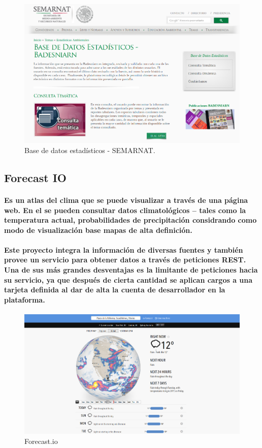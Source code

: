     \begin{figure}[h!]
        \centering
          \includegraphics[width=\textwidth]{./images/BADESNIARN.png}
        \caption{Base de datos estadísticos - SEMARNAT.}
    \end{figure}

  \subsection {Forecast IO}
    \paragraph {Es un atlas del clima que se puede visualizar a través de una página web. En el se pueden consultar datos climatológicos – tales como la temperatura actual, probabilidades de precipitación considrando como modo de visualización base mapas de alta definición.}

    \paragraph{Este proyecto integra la información de diversas fuentes y también provee un servicio para obtener datos a través de peticiones REST. Una de sus más grandes desventajas es la limitante de peticiones hacia su servicio, ya que después de cierta cantidad se aplican cargos a una tarjeta definida al dar de alta la cuenta de desarrollador en la plataforma. \cite{14}}

    \begin{figure}[h!]
        \centering
          \includegraphics[width=\textwidth]{./images/ForecastIO.png}
        \caption{Forecast.io}
    \end{figure}    

